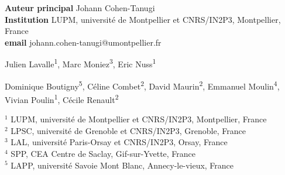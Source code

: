 
\def\altaffilmark#1{\textsuperscript{#1}}
\def\affil#1{\noindent #1 \\}

%

\begin{flushleft}
  {\bf Auteur principal}  Johann Cohen-Tanugi\\
  {\bf Institution}  LUPM, université de Montpellier et CNRS/IN2P3, Montpellier, France\\
  {\bf email} johann.cohen-tanugi@umontpellier.fr
\end{flushleft}       


\begin{raggedright}
\small
Julien Lavalle\altaffilmark{1}, Marc Moniez\altaffilmark{3}, Eric Nuss\altaffilmark{1}
\end{raggedright}

\begin{raggedright}
\small
Dominique Boutigny\altaffilmark{5},
Céline Combet\altaffilmark{2},
David Maurin\altaffilmark{2},
Emmanuel Moulin\altaffilmark{4},
Vivian Poulin\altaffilmark{1},
Cécile Renault\altaffilmark{2}
\end{raggedright}

\scriptsize

\affil{$^{1}$ LUPM, université de Montpellier et CNRS/IN2P3, Montpellier, France}
\affil{$^{2}$ LPSC, université de Grenoble et CNRS/IN2P3, Grenoble, France}
\affil{$^{3}$ LAL, université Paris-Orsay et CNRS/IN2P3, Orsay, France}
\affil{$^{4}$ SPP, CEA Centre de Saclay, Gif-sur-Yvette, France}
\affil{$^{5}$ LAPP, université Savoie Mont Blanc, Annecy-le-vieux, France}
\normalsize

